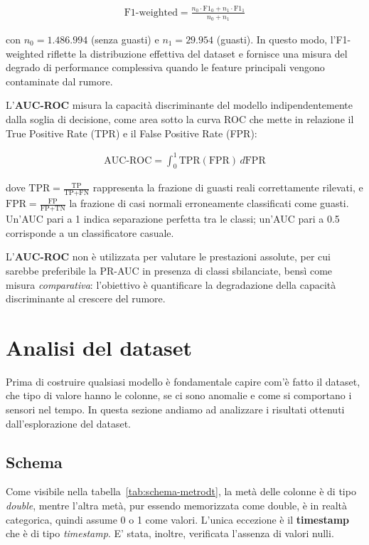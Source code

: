 \documentclass[../main.tex]{subfiles}
\begin{document}
\begin{align}
    \text{F1-weighted} = \frac{n_0 \cdot \text{F1}_0 + 
    n_1 \cdot \text{F1}_1}{n_0 + n_1} \label{eq:f1w}
\end{align}

con $n_0 = 1.486.994$ (senza guasti) e $n_1 = 29.954$ (guasti). In questo modo, l'F1-weighted riflette la distribuzione effettiva del dataset e fornisce una misura del degrado di performance complessiva quando le feature principali vengono contaminate dal rumore.

L'\textbf{AUC-ROC} misura la capacità discriminante del modello indipendentemente dalla soglia di decisione, come area sotto la curva ROC che mette in relazione il True Positive Rate (TPR) e il False Positive Rate (FPR):

\begin{align}
    \text{AUC-ROC} = \int_0^1 \text{TPR}(\text{FPR}) \, 
    d\text{FPR} \label{eq:roc}
\end{align}

dove $\text{TPR} = \frac{\text{TP}}{\text{TP} + \text{FN}}$ rappresenta la frazione di guasti reali correttamente rilevati, e $\text{FPR} = \frac{\text{FP}}{\text{FP} + \text{TN}}$ la frazione di casi normali erroneamente classificati come guasti. Un'AUC pari a 1 indica separazione perfetta tra le classi; un'AUC pari a 0.5 corrisponde a un classificatore casuale.

L'\textbf{AUC-ROC} non è utilizzata per valutare le prestazioni assolute, per cui sarebbe preferibile la PR-AUC in presenza di classi sbilanciate, bensì come misura \textit{comparativa}: l'obiettivo è quantificare la degradazione della capacità discriminante al crescere del rumore.


\newpage


\section{Analisi del dataset}
Prima di costruire qualsiasi modello è fondamentale capire com'è fatto il dataset, che tipo di valore hanno le colonne, se ci sono anomalie e come si comportano i sensori nel tempo. In questa sezione andiamo ad analizzare i risultati ottenuti dall'esplorazione del dataset.

\subsection{Schema}
Come visibile nella tabella~\ref{tab:schema-metrodt}, la metà delle colonne è di tipo \textit{double}, mentre l’altra metà, pur essendo memorizzata come double, è in realtà categorica, quindi assume 0 o 1 come valori. L'unica eccezione è il \textbf{timestamp} che è di tipo \textit{timestamp}. E' stata, inoltre, verificata l'assenza di valori nulli.
\end{document}
